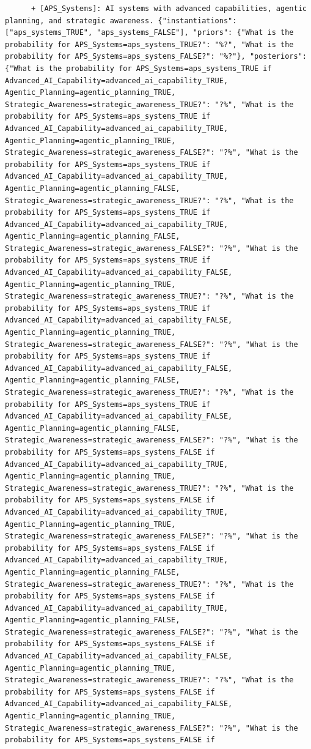 \documentclass[
  11pt,
  letterpaper,
]{book}
\begin{document}
\begin{verbatim}
      + [APS_Systems]: AI systems with advanced capabilities, agentic planning, and strategic awareness. {"instantiations": ["aps_systems_TRUE", "aps_systems_FALSE"], "priors": {"What is the probability for APS_Systems=aps_systems_TRUE?": "%?", "What is the probability for APS_Systems=aps_systems_FALSE?": "%?"}, "posteriors": {"What is the probability for APS_Systems=aps_systems_TRUE if Advanced_AI_Capability=advanced_ai_capability_TRUE, Agentic_Planning=agentic_planning_TRUE, Strategic_Awareness=strategic_awareness_TRUE?": "?%", "What is the probability for APS_Systems=aps_systems_TRUE if Advanced_AI_Capability=advanced_ai_capability_TRUE, Agentic_Planning=agentic_planning_TRUE, Strategic_Awareness=strategic_awareness_FALSE?": "?%", "What is the probability for APS_Systems=aps_systems_TRUE if Advanced_AI_Capability=advanced_ai_capability_TRUE, Agentic_Planning=agentic_planning_FALSE, Strategic_Awareness=strategic_awareness_TRUE?": "?%", "What is the probability for APS_Systems=aps_systems_TRUE if Advanced_AI_Capability=advanced_ai_capability_TRUE, Agentic_Planning=agentic_planning_FALSE, Strategic_Awareness=strategic_awareness_FALSE?": "?%", "What is the probability for APS_Systems=aps_systems_TRUE if Advanced_AI_Capability=advanced_ai_capability_FALSE, Agentic_Planning=agentic_planning_TRUE, Strategic_Awareness=strategic_awareness_TRUE?": "?%", "What is the probability for APS_Systems=aps_systems_TRUE if Advanced_AI_Capability=advanced_ai_capability_FALSE, Agentic_Planning=agentic_planning_TRUE, Strategic_Awareness=strategic_awareness_FALSE?": "?%", "What is the probability for APS_Systems=aps_systems_TRUE if Advanced_AI_Capability=advanced_ai_capability_FALSE, Agentic_Planning=agentic_planning_FALSE, Strategic_Awareness=strategic_awareness_TRUE?": "?%", "What is the probability for APS_Systems=aps_systems_TRUE if Advanced_AI_Capability=advanced_ai_capability_FALSE, Agentic_Planning=agentic_planning_FALSE, Strategic_Awareness=strategic_awareness_FALSE?": "?%", "What is the probability for APS_Systems=aps_systems_FALSE if Advanced_AI_Capability=advanced_ai_capability_TRUE, Agentic_Planning=agentic_planning_TRUE, Strategic_Awareness=strategic_awareness_TRUE?": "?%", "What is the probability for APS_Systems=aps_systems_FALSE if Advanced_AI_Capability=advanced_ai_capability_TRUE, Agentic_Planning=agentic_planning_TRUE, Strategic_Awareness=strategic_awareness_FALSE?": "?%", "What is the probability for APS_Systems=aps_systems_FALSE if Advanced_AI_Capability=advanced_ai_capability_TRUE, Agentic_Planning=agentic_planning_FALSE, Strategic_Awareness=strategic_awareness_TRUE?": "?%", "What is the probability for APS_Systems=aps_systems_FALSE if Advanced_AI_Capability=advanced_ai_capability_TRUE, Agentic_Planning=agentic_planning_FALSE, Strategic_Awareness=strategic_awareness_FALSE?": "?%", "What is the probability for APS_Systems=aps_systems_FALSE if Advanced_AI_Capability=advanced_ai_capability_FALSE, Agentic_Planning=agentic_planning_TRUE, Strategic_Awareness=strategic_awareness_TRUE?": "?%", "What is the probability for APS_Systems=aps_systems_FALSE if Advanced_AI_Capability=advanced_ai_capability_FALSE, Agentic_Planning=agentic_planning_TRUE, Strategic_Awareness=strategic_awareness_FALSE?": "?%", "What is the probability for APS_Systems=aps_systems_FALSE if 
\end{verbatim}
\end{document}
